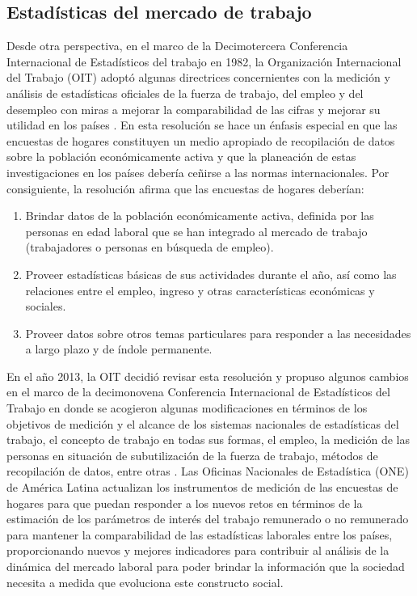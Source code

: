 \documentclass[
  12pt,
]{book}
\providecommand{\tightlist}{%
  \setlength{\itemsep}{0pt}\setlength{\parskip}{0pt}}
\begin{document}
\hypertarget{estaduxedsticas-del-mercado-de-trabajo}{%
\subsection{Estadísticas del mercado de trabajo}\label{estaduxedsticas-del-mercado-de-trabajo}}

Desde otra perspectiva, en el marco de la Decimotercera Conferencia Internacional de Estadísticos del trabajo en 1982, la Organización Internacional del Trabajo (OIT) adoptó algunas directrices concernientes con la medición y análisis de estadísticas oficiales de la fuerza de trabajo, del empleo y del desempleo con miras a mejorar la comparabilidad de las cifras y mejorar su utilidad en los países \citep{OIT_1982}. En esta resolución se hace un énfasis especial en que las encuestas de hogares constituyen un medio apropiado de recopilación de datos sobre la población económicamente activa y que la planeación de estas investigaciones en los países debería ceñirse a las normas internacionales. Por consiguiente, la resolución afirma que las encuestas de hogares deberían:

\begin{enumerate}
\def\labelenumi{\arabic{enumi}.}
\tightlist
\item
  Brindar datos de la población económicamente activa, definida por las personas en edad laboral que se han integrado al mercado de trabajo (trabajadores o personas en búsqueda de empleo).
\item
  Proveer estadísticas básicas de sus actividades durante el año, así como las relaciones entre el empleo, ingreso y otras características económicas y sociales.
\item
  Proveer datos sobre otros temas particulares para responder a las necesidades a largo plazo y de índole permanente.
\end{enumerate}

En el año 2013, la OIT decidió revisar esta resolución y propuso algunos cambios en el marco de la decimonovena Conferencia Internacional de Estadísticos del Trabajo en donde se acogieron algunas modificaciones en términos de los objetivos de medición y el alcance de los sistemas nacionales de estadísticas del trabajo, el concepto de trabajo en todas sus formas, el empleo, la medición de las personas en situación de subutilización de la fuerza de trabajo, métodos de recopilación de datos, entre otras \citep{OIT_2013}. Las Oficinas Nacionales de Estadística (ONE) de América Latina actualizan los instrumentos de medición de las encuestas de hogares para que puedan responder a los nuevos retos en términos de la estimación de los parámetros de interés del trabajo remunerado o no remunerado para mantener la comparabilidad de las estadísticas laborales entre los países, proporcionando nuevos y mejores indicadores para contribuir al análisis de la dinámica del mercado laboral para poder brindar la información que la sociedad necesita a medida que evoluciona este constructo social.
\end{document}
